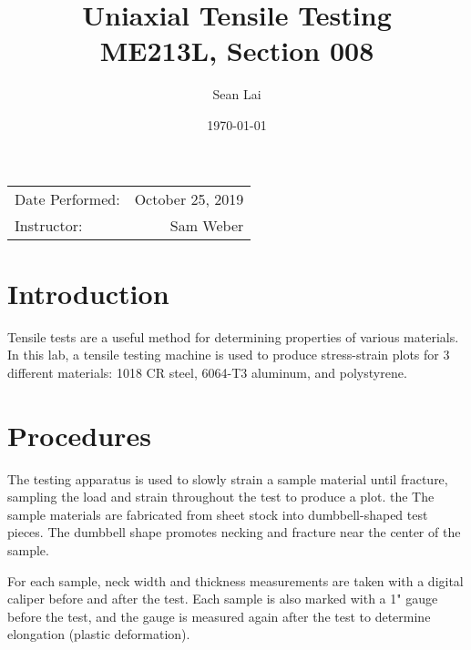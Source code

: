 \documentclass{article}
\title{Uniaxial Tensile Testing \\ ME213L, Section 008}
\author{Sean Lai} %
\date{\today} %
\begin{document}
\maketitle %

\begin{center}
\begin{tabular}{l r}
Date Performed: & October 25, 2019 \\ %

Instructor: & Sam Weber %
\end{tabular}
\end{center}



\section{Introduction}

Tensile tests are a useful method for determining properties of various materials. In this lab, a tensile testing machine is used to produce stress-strain plots for 3 different materials: 1018 CR steel, 6064-T3 aluminum, and polystyrene.



\section{Procedures}

The testing apparatus is used to slowly strain a sample material until fracture, sampling the load and strain throughout the test to produce a plot. the The sample materials are fabricated from sheet stock into dumbbell-shaped test pieces. The dumbbell shape promotes necking and fracture near the center of the sample.
\vspace{1em}

For each sample, neck width and thickness measurements are taken with a digital caliper before and after the test. Each sample is also marked with a 1" gauge before the test, and the gauge is measured again after the test to determine elongation (plastic deformation).
\end{document}
